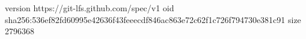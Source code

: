 version https://git-lfs.github.com/spec/v1
oid sha256:536ef82fd60995e42636f43feeecdf846ac863e72c62f1c726f794730e381c91
size 2796368
